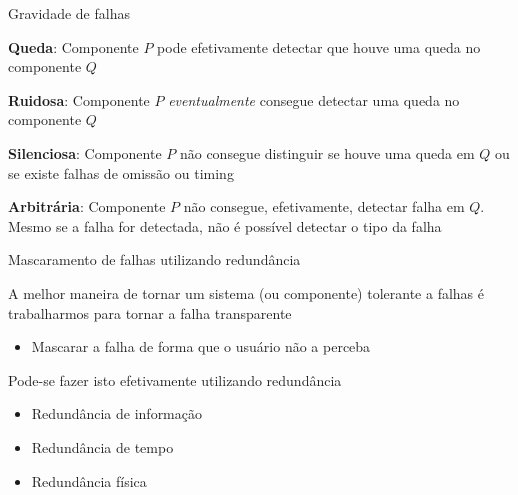 \documentclass[compress]{beamer}
\begin{document}

\begin{frame}{Gravidade de falhas}

\textbf{Queda}: Componente $P$ pode efetivamente detectar que houve uma queda no componente $Q$

\vspace{0.5cm}

\textbf{Ruidosa}: Componente $P$ \textit{eventualmente} consegue detectar uma queda no componente $Q$

\vspace{0.5cm}

\textbf{Silenciosa}: Componente $P$ não consegue distinguir se houve uma queda em $Q$ ou se existe falhas de omissão ou timing

\vspace{0.5cm}

\textbf{Arbitrária}: Componente $P$ não consegue, efetivamente, detectar falha em $Q$. Mesmo se a falha for detectada, não é possível detectar o tipo da falha

\end{frame}


\begin{frame}{Mascaramento de falhas utilizando redundância}

A melhor maneira de tornar um sistema (ou componente) tolerante a falhas é trabalharmos para tornar a falha transparente
\begin{itemize}
    \item Mascarar a falha de forma que o usuário não a perceba
\end{itemize}
    
\vspace{0.5cm}

Pode-se fazer isto efetivamente utilizando redundância
\begin{itemize}
    \item Redundância de informação
    \item Redundância de tempo
    \item Redundância física
\end{itemize}
\end{frame}

\end{document}
